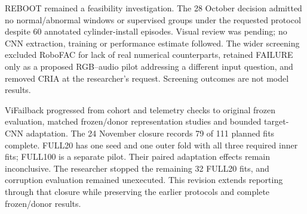 REBOOT remained a feasibility investigation. The 28 October decision admitted no
normal/abnormal windows or supervised groups under the requested protocol despite 60
annotated cylinder-install episodes. Visual review was pending; no CNN extraction,
training or performance estimate followed. The wider screening excluded RoboFAC for lack
of real numerical counterparts, retained FAILURE only as a proposed RGB--audio pilot
addressing a different input question, and removed CRIA at the researcher's request.
Screening outcomes are not model results.

ViFailback progressed from cohort and telemetry checks to original frozen evaluation,
matched frozen/donor representation studies and bounded target-CNN adaptation. The 24
November closure records 79 of 111 planned fits complete. FULL20 has one seed and one
outer fold with all three required inner fits; FULL100 is a separate pilot. Their paired
adaptation effects remain inconclusive. The researcher stopped the remaining 32 FULL20
fits, and corruption evaluation remained unexecuted. This revision extends reporting
through that closure while preserving the earlier protocols and complete frozen/donor
results.

